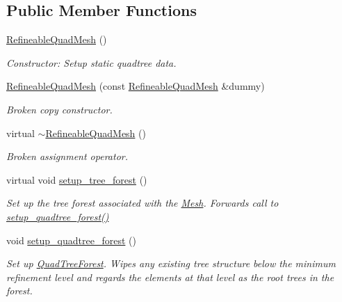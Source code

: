 \subsection*{Public Member Functions}
\begin{DoxyCompactItemize}
\item 
\hyperlink{classoomph_1_1RefineableQuadMesh_aac672fe61fe31636cadc243b82c05c9e}{Refineable\+Quad\+Mesh} ()
\begin{DoxyCompactList}\small\item\em Constructor\+: Setup static quadtree data. \end{DoxyCompactList}\item 
\hyperlink{classoomph_1_1RefineableQuadMesh_a17e78defc7047b3ffa57feb3e0ff4488}{Refineable\+Quad\+Mesh} (const \hyperlink{classoomph_1_1RefineableQuadMesh}{Refineable\+Quad\+Mesh} \&dummy)
\begin{DoxyCompactList}\small\item\em Broken copy constructor. \end{DoxyCompactList}\item 
virtual \hyperlink{classoomph_1_1RefineableQuadMesh_a597f1137fa2bd77cc0126a96eccaf97f}{$\sim$\+Refineable\+Quad\+Mesh} ()
\begin{DoxyCompactList}\small\item\em Broken assignment operator. \end{DoxyCompactList}\item 
virtual void \hyperlink{classoomph_1_1RefineableQuadMesh_ae3fed75707aa829323aeaf25ac343247}{setup\+\_\+tree\+\_\+forest} ()
\begin{DoxyCompactList}\small\item\em Set up the tree forest associated with the \hyperlink{classoomph_1_1Mesh}{Mesh}. Forwards call to \hyperlink{classoomph_1_1RefineableQuadMesh_ab27780da6f9be1b625d75fc4973ce8f1}{setup\+\_\+quadtree\+\_\+forest()} \end{DoxyCompactList}\item 
void \hyperlink{classoomph_1_1RefineableQuadMesh_ab27780da6f9be1b625d75fc4973ce8f1}{setup\+\_\+quadtree\+\_\+forest} ()
\begin{DoxyCompactList}\small\item\em Set up \hyperlink{classoomph_1_1QuadTreeForest}{Quad\+Tree\+Forest}. Wipes any existing tree structure below the minimum refinement level and regards the elements at that level as the root trees in the forest. \end{DoxyCompactList}\end{DoxyCompactItemize}
